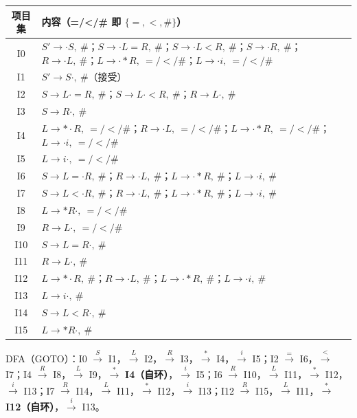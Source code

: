\documentclass[12pt,a4paper,fontset=windows]{ctexart}
\begin{document}
\begin{center}
\renewcommand{\arraystretch}{1.25}
\begin{tabular}{c p{11.8cm}}
\toprule
\textbf{项目集} & \textbf{内容（=/</\# 即 $\{=,<,\#\}$）} \\
\midrule
I0 & $S' \to \cdot S,\ \#$；$S \to \cdot L=R,\ \#$；$S \to \cdot L<R,\ \#$；$S \to \cdot R,\ \#$；$R \to \cdot L,\ \#$；$L \to \cdot *R,\ =/</\#$；$L \to \cdot i,\ =/</\#$ \\
I1 & $S' \to S\cdot,\ \#$（接受） \\
I2 & {\boldmath $S \to L\cdot =R,\ \#$}；{\boldmath $S \to L\cdot <R,\ \#$}；{\boldmath $R \to L\cdot,\ \#$} \\
I3 & $S \to R\cdot,\ \#$ \\
I4 & $L \to *\cdot R,\ =/</\#$；$R \to \cdot L,\ =/</\#$；$L \to \cdot *R,\ =/</\#$；$L \to \cdot i,\ =/</\#$ \\
I5 & $L \to i\cdot,\ =/</\#$ \\
I6 & $S \to L=\cdot R,\ \#$；$R \to \cdot L,\ \#$；$L \to \cdot *R,\ \#$；$L \to \cdot i,\ \#$ \\
I7 & $S \to L<\cdot R,\ \#$；$R \to \cdot L,\ \#$；$L \to \cdot *R,\ \#$；$L \to \cdot i,\ \#$ \\
I8 & $L \to *R\cdot,\ =/</\#$ \\
I9 & $R \to L\cdot,\ =/</\#$ \\
I10 & $S \to L=R\cdot,\ \#$ \\
I11 & $R \to L\cdot,\ \#$ \\
I12 & $L \to *\cdot R,\ \#$；$R \to \cdot L,\ \#$；$L \to \cdot *R,\ \#$；$L \to \cdot i,\ \#$ \\
I13 & $L \to i\cdot,\ \#$ \\
I14 & $S \to L<R\cdot,\ \#$ \\
I15 & $L \to *R\cdot,\ \#$ \\
\bottomrule
\end{tabular}
\end{center}

DFA（GOTO）：I0 $\xrightarrow{S}$ I1，$\xrightarrow{L}$ I2，$\xrightarrow{R}$ I3，$\xrightarrow{*}$ I4，$\xrightarrow{i}$ I5；I2 $\xrightarrow{=}$ I6，$\xrightarrow{<}$ I7；I4 $\xrightarrow{R}$ I8，$\xrightarrow{L}$ I9，$\xrightarrow{*}$ \textbf{I4（自环）}，$\xrightarrow{i}$ I5；I6 $\xrightarrow{R}$ I10，$\xrightarrow{L}$ I11，$\xrightarrow{*}$ I12，$\xrightarrow{i}$ I13；I7 $\xrightarrow{R}$ I14，$\xrightarrow{L}$ I11，$\xrightarrow{*}$ I12，$\xrightarrow{i}$ I13；I12 $\xrightarrow{R}$ I15，$\xrightarrow{L}$ I11，$\xrightarrow{*}$ \textbf{I12（自环）}，$\xrightarrow{i}$ I13。
\end{document}
